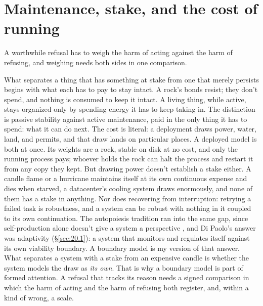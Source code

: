 \section{Maintenance, stake, and the cost of running}
\label{sec:21.1}
A worthwhile refusal has to weigh the harm of acting against the harm of refusing, and weighing needs both sides in one comparison.


What separates a thing that has something at stake from one that merely persists begins with what each has to pay to stay intact. A rock's bonds resist; they don't spend, and nothing is consumed to keep it intact. A living thing, while active, stays organized only by spending energy it has to keep taking in. The distinction is passive stability against active maintenance, paid in the only thing it has to spend: what it can do next. The cost is literal: a deployment draws power, water, land, and permits, and that draw lands on particular places. A deployed model is both at once. Its weights are a rock, stable on disk at no cost, and only the running process pays; whoever holds the rock can halt the process and restart it from any copy they kept. But drawing power doesn't establish a stake either. A candle flame or a hurricane maintains itself at its own continuous expense and dies when starved, a datacenter's cooling system draws enormously, and none of them has a stake in anything. Nor does recovering from interruption: retrying a failed task is robustness, and a system can be robust with nothing in it coupled to its own continuation. The autopoiesis tradition ran into the same gap, since self-production alone doesn't give a system a perspective \autocite{MaturanaVarela1980,jonas1966phenomenon}, and Di Paolo's answer was adaptivity (\S\ref{sec:20.1}): a system that monitors and regulates itself against its own viability boundary.
A boundary model is my version of that answer. What separates a system with a stake from an expensive candle is whether the system models the draw as \emph{its own}. That is why a boundary model is part of formed attention. A refusal that tracks its reason needs a signed comparison in which the harm of acting and the harm of refusing both register, and, within a kind of wrong, a scale.

